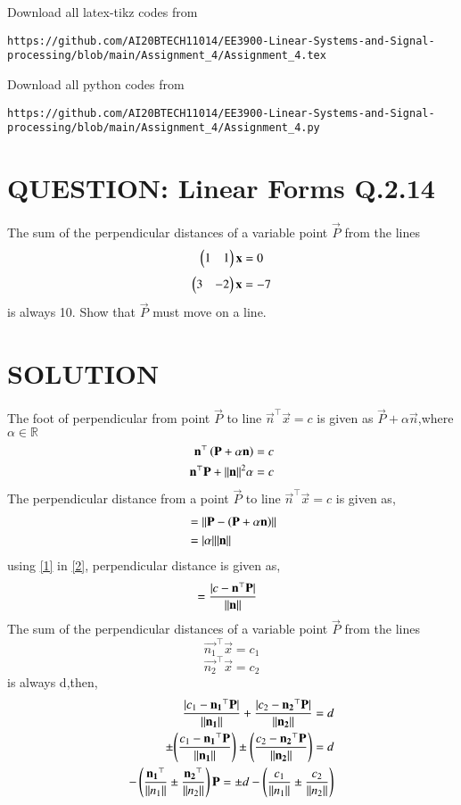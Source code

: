 \documentclass[journal,12pt,twocolumn]{IEEEtran}
\begin{document}
\maketitle
\newpage
\bigskip
\renewcommand{\thefigure}{\theenumi}
\renewcommand{\thetable}{\theenumi}
\newcommand{\R}{\mathbb{R}}
Download all  latex-tikz codes from 
\begin{lstlisting}
https://github.com/AI20BTECH11014/EE3900-Linear-Systems-and-Signal-processing/blob/main/Assignment_4/Assignment_4.tex
\end{lstlisting}
%
Download all python codes from 
\begin{lstlisting}
https://github.com/AI20BTECH11014/EE3900-Linear-Systems-and-Signal-processing/blob/main/Assignment_4/Assignment_4.py
\end{lstlisting}
\vspace{0.5cm}
\section{QUESTION: Linear Forms Q.2.14}
The sum of the perpendicular distances of a variable point $\vec{P}$ from the lines 
$$\begin{pmatrix}1&1\end{pmatrix} \mathbf{x} = 0$$
$$\begin{pmatrix}3&-2\end{pmatrix} \mathbf{x} = -7$$
is always 10. Show that $\vec{P}$ must move on a line.

\section{SOLUTION}
The foot of perpendicular from point $\vec{P}$ to line $ \vec{n}^{\top }\vec{x} =c$ is given as $\vec{P} + \alpha \vec{n}$,where $\alpha \in \R$
\begin{align}
\mathbf{n}^{\top }\left(\mathbf{P} + \alpha\mathbf{n}\right) = c\\
 \mathbf{n}^{\top }\mathbf{P} + \lVert\mathbf{n}\rVert^{2}\alpha =c \label{1}
\end{align}
The perpendicular distance from a point $\vec{P}$ to line $ \vec{n}^{\top }\vec{x} =c$ is given as,
\begin{align}
&=\lVert\mathbf{P} - \left(\mathbf{P} + \alpha\mathbf{n}\right)\rVert\\
&=\vert\alpha\vert\lVert\mathbf{n}\rVert \label{2}
\end{align}
using \eqref{1} in \eqref{2}, perpendicular distance is given as,
\begin{align}
&=\dfrac{\vert c- \mathbf{n}^{\top }\mathbf{P}\vert}{\lVert\mathbf{n}\rVert} \label{3}
\end{align}
The sum of the perpendicular distances of a variable point $\vec{P}$ from the lines 
$$\vec{n_{1}}^{\top } \vec{x} = c_{1}$$
$$\vec{n_{2}}^{\top } \vec{x} = c_{2}$$
is always d,then,
\begin{align}
\dfrac{\vert c_{1}- \mathbf{n_{1}}^{\top }\mathbf{P}\vert}{\lVert\mathbf{n_{1}}\rVert}+ \dfrac{\vert c_{2}- \mathbf{n_{2}}^{\top }\mathbf{P}\vert}{\lVert\mathbf{n_{2}}\rVert} = d\\
\pm{\ensuremath{\left(\dfrac{{c_{1}- \mathbf{n_{1}}^{\top }\mathbf{P}}}{\lVert\mathbf{n_{1}}\rVert}\right)}} \pm{\ensuremath{\left(\dfrac{{c_{2}- \mathbf{n_{2}}^{\top }\mathbf{P}}}{\lVert\mathbf{n_{2}}\rVert}\right)}} = d\\
-\left(\dfrac{\mathbf{n_{1}}^{\top }}{\lVert n_{1}\rVert} \pm \dfrac{\mathbf{n_{2}}^{\top }}{\lVert n_{2}\rVert}\right)\mathbf{P} = \pm d -\left(\dfrac{c_{1}}{\lVert n_{1}\rVert} \pm \dfrac{c_{2}}{\lVert n_{2}\rVert}\right)
\end{align}
\end{document}
